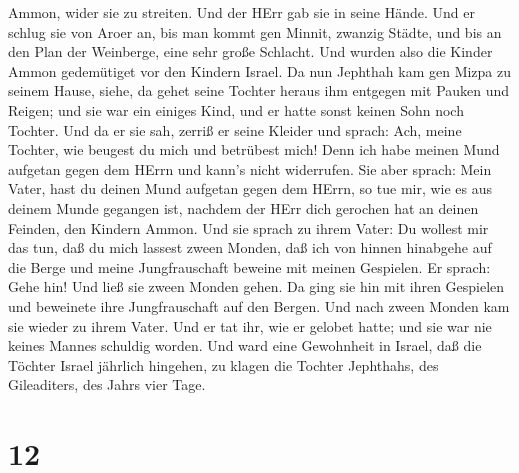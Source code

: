 Ammon, wider sie zu streiten. Und der HErr gab sie in seine Hände.
 Und er schlug sie von Aroer an, bis man kommt gen Minnit,
zwanzig Städte, und bis an den Plan der Weinberge, eine sehr große
Schlacht. Und wurden also die Kinder Ammon gedemütiget vor den Kindern
Israel.  Da nun Jephthah kam gen Mizpa zu seinem Hause,
siehe, da gehet seine Tochter heraus ihm entgegen mit Pauken und Reigen;
und sie war ein einiges Kind, und er hatte sonst keinen Sohn noch
Tochter.  Und da er sie sah, zerriß er seine Kleider und
sprach: Ach, meine Tochter, wie beugest du mich und betrübest mich! Denn
ich habe meinen Mund aufgetan gegen dem HErrn und kann's nicht
widerrufen.  Sie aber sprach: Mein Vater, hast du deinen
Mund aufgetan gegen dem HErrn, so tue mir, wie es aus deinem Munde
gegangen ist, nachdem der HErr dich gerochen hat an deinen Feinden, den
Kindern Ammon.  Und sie sprach zu ihrem Vater: Du wollest
mir das tun, daß du mich lassest zween Monden, daß ich von hinnen
hinabgehe auf die Berge und meine Jungfrauschaft beweine mit meinen
Gespielen.  Er sprach: Gehe hin! Und ließ sie zween Monden
gehen. Da ging sie hin mit ihren Gespielen und beweinete ihre
Jungfrauschaft auf den Bergen.  Und nach zween Monden kam
sie wieder zu ihrem Vater. Und er tat ihr, wie er gelobet hatte; und sie
war nie keines Mannes schuldig worden. Und ward eine Gewohnheit in
Israel,  daß die Töchter Israel jährlich hingehen, zu
klagen die Tochter Jephthahs, des Gileaditers, des Jahrs vier Tage.

\hypertarget{section-11}{%
\section{12}\label{section-11}}


